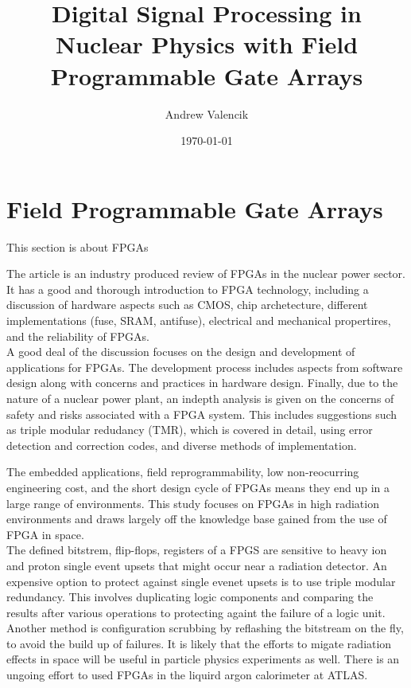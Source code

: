 \documentclass[12pt]{article}
\begin{document}
\title{Digital Signal Processing in Nuclear Physics with Field Programmable Gate Arrays}

\author{Andrew Valencik}

\date{\today}

\maketitle


\section{Field Programmable Gate Arrays}   %
This section is about FPGAs
\\[20pt]

{\large\textbf{\cite{currentState}}}

The article is an industry produced review of FPGAs in the nuclear power sector. It has a good and thorough introduction to FPGA technology, including a discussion of hardware aspects such as CMOS, chip archetecture, different implementations (fuse, SRAM, antifuse), electrical and mechanical propertires, and the reliability of FPGAs.
\\
A good deal of the discussion focuses on the design and development of applications for FPGAs. The development process includes aspects from software design along with concerns and practices in hardware design. Finally, due to the nature of a nuclear power plant, an indepth analysis is given on the concerns of safety and risks associated with a FPGA system. This includes suggestions such as triple modular redudancy (TMR), which is covered in detail, using error detection and correction codes, and diverse methods of implementation.
\\[20pt]

{\large\textbf{\cite{Wirthlin}}}

The embedded applications, field reprogrammability, low non-reocurring engineering cost, and the short design cycle of FPGAs means they end up in a large range of environments. This study focuses on FPGAs in high radiation environments and draws largely off the knowledge base gained from the use of FPGA in space. 
\\
The defined bitstrem, flip-flops, registers of a FPGS are sensitive to heavy ion and proton single event upsets that might occur near a radiation detector. An expensive option to protect against single evenet upsets is to use triple modular redundancy. This involves duplicating logic components and comparing the results after various operations to protecting againt the failure of a logic unit. Another method is configuration scrubbing by reflashing the bitstream on the fly, to avoid the build up of failures. It is likely that the efforts to migate radiation effects in space will be useful in particle physics experiments as well. There is an ungoing effort to used FPGAs in the liquird argon calorimeter at ATLAS. 
\\[20pt]
\end{document}
